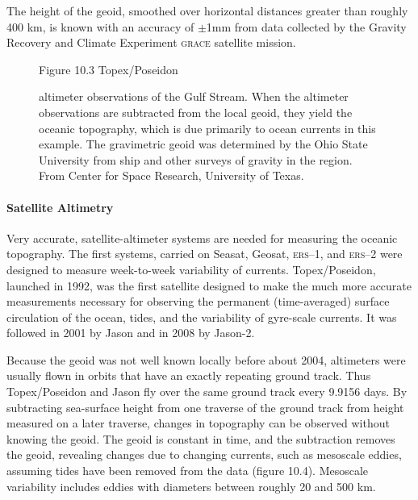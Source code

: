The height of the geoid, smoothed over horizontal
distances greater than roughly 400 km, is known with an
accuracy of $\pm$1mm from data collected by the
Gravity Recovery and Climate Experiment
\textsc{grace} satellite mission.

\begin{figure}[t!]
\footnotesize
Figure 10.3 Topex/Poseidon \rule{0mm}{3ex}altimeter observations of the Gulf
Stream. When the altimeter observations are
subtracted from the local geoid, they yield the oceanic
topography, which is due primarily to ocean currents in this
example. The gravimetric geoid was determined by the Ohio
State University from ship and other surveys of gravity in the
region. From Center for Space Research, University of Texas.
\label{sshprofile}
\vspace{-5ex}
\end{figure}

\paragraph{Satellite Altimetry}
Very accurate, satellite-altimeter systems
are needed for measuring the oceanic topography. The first systems,
carried on Seasat, Geosat, \textsc{ers}--1, and
\textsc{ers}--2 were designed to measure
week-to-week variability of
currents. Topex/Poseidon, launched in 1992, was
the first satellite designed to make the much more accurate
measurements necessary for observing the permanent (time-averaged)
surface circulation of the ocean, tides, and the variability of
gyre-scale currents. It was followed in 2001 by Jason and
in 2008 by Jason-2.

Because the geoid was not well known locally before about
2004, altimeters were usually flown in orbits that have an exactly
repeating ground track. Thus Topex/Poseidon and
Jason fly over the same ground track every 9.9156
days. By subtracting sea-surface height from one traverse of the
ground track from height measured on a later traverse, changes in
topography can be observed without knowing the geoid. The
geoid is constant in time, and the subtraction removes
the geoid, revealing changes due to changing currents, such as
mesoscale eddies, assuming tides have been
removed from the data (figure 10.4). Mesoscale variability includes
eddies with diameters between roughly 20 and 500 km.

